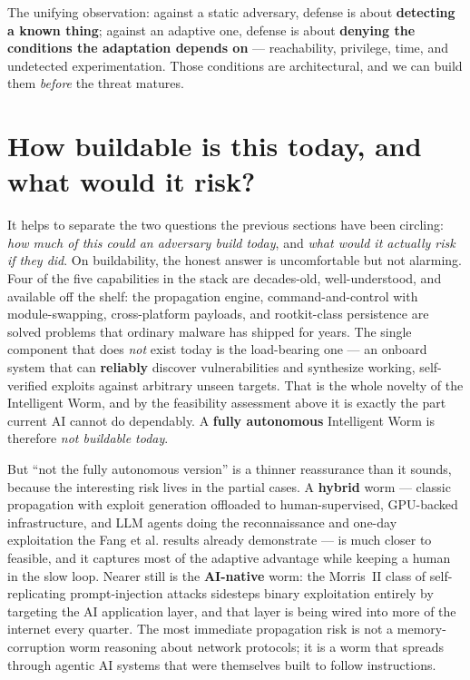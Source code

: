 \documentclass[11pt,a4paper]{article}
\begin{document}
The unifying observation: against a static adversary, defense is about \textbf{detecting a known thing}; against an adaptive one, defense is about \textbf{denying the conditions the adaptation depends on} --- reachability, privilege, time, and undetected experimentation. Those conditions are architectural, and we can build them \emph{before} the threat matures.

\section{How buildable is this today, and what would it risk?}

It helps to separate the two questions the previous sections have been circling: \emph{how much of this could an adversary build today}, and \emph{what would it actually risk if they did}. On buildability, the honest answer is uncomfortable but not alarming. Four of the five capabilities in the stack are decades-old, well-understood, and available off the shelf: the propagation engine, command-and-control with module-swapping, cross-platform payloads, and rootkit-class persistence are solved problems that ordinary malware has shipped for years. The single component that does \emph{not} exist today is the load-bearing one --- an onboard system that can \textbf{reliably} discover vulnerabilities and synthesize working, self-verified exploits against arbitrary unseen targets. That is the whole novelty of the Intelligent Worm, and by the feasibility assessment above it is exactly the part current AI cannot do dependably. A \textbf{fully autonomous} Intelligent Worm is therefore \emph{not buildable today}.

But ``not the fully autonomous version'' is a thinner reassurance than it sounds, because the interesting risk lives in the partial cases. A \textbf{hybrid} worm --- classic propagation with exploit generation offloaded to human-supervised, GPU-backed infrastructure, and LLM agents doing the reconnaissance and one-day exploitation the Fang et al. results already demonstrate --- is much closer to feasible, and it captures most of the adaptive advantage while keeping a human in the slow loop. Nearer still is the \textbf{AI-native} worm: the Morris~II class of self-replicating prompt-injection attacks sidesteps binary exploitation entirely by targeting the AI application layer, and that layer is being wired into more of the internet every quarter. The most immediate propagation risk is not a memory-corruption worm reasoning about network protocols; it is a worm that spreads through agentic AI systems that were themselves built to follow instructions.
\end{document}
